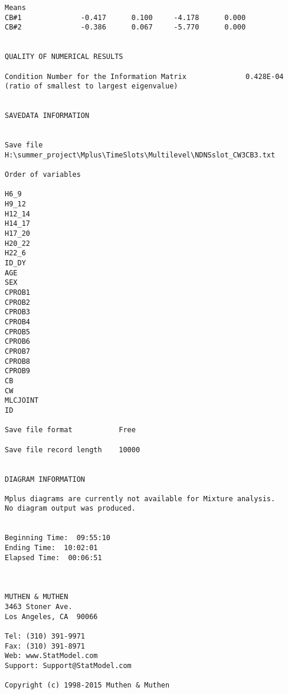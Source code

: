 \begin{verbatim}
Means
CB#1              -0.417      0.100     -4.178      0.000
CB#2              -0.386      0.067     -5.770      0.000


QUALITY OF NUMERICAL RESULTS

Condition Number for the Information Matrix              0.428E-04
(ratio of smallest to largest eigenvalue)


SAVEDATA INFORMATION


Save file
H:\summer_project\Mplus\TimeSlots\Multilevel\NDNSslot_CW3CB3.txt

Order of variables

H6_9
H9_12
H12_14
H14_17
H17_20
H20_22
H22_6
ID_DY
AGE
SEX
CPROB1
CPROB2
CPROB3
CPROB4
CPROB5
CPROB6
CPROB7
CPROB8
CPROB9
CB
CW
MLCJOINT
ID

Save file format           Free

Save file record length    10000


DIAGRAM INFORMATION

Mplus diagrams are currently not available for Mixture analysis.
No diagram output was produced.


Beginning Time:  09:55:10
Ending Time:  10:02:01
Elapsed Time:  00:06:51



MUTHEN & MUTHEN
3463 Stoner Ave.
Los Angeles, CA  90066

Tel: (310) 391-9971
Fax: (310) 391-8971
Web: www.StatModel.com
Support: Support@StatModel.com

Copyright (c) 1998-2015 Muthen & Muthen
\end{verbatim}
